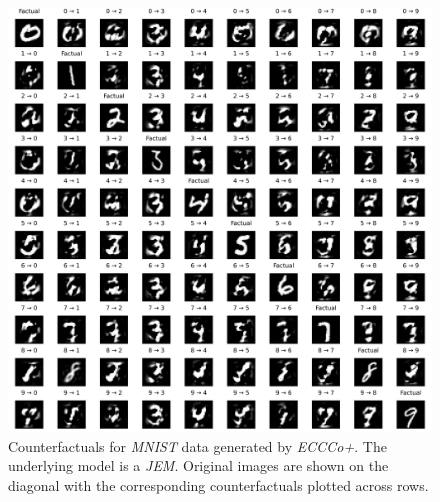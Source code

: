 \begin{figure}
  \centering
  \includegraphics[width=1.0\linewidth]{../www/mnist_all_jem_eccco.png}
  \caption{Counterfactuals for \textit{MNIST} data generated by \textit{ECCCo+}. The underlying model is a \textit{JEM}. Original images are shown on the diagonal with the corresponding counterfactuals plotted across rows.}\label{fig:mnist-eccco-jem}
\end{figure}

